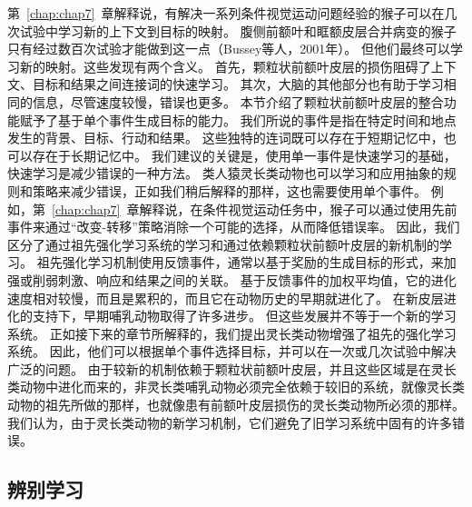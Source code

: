 第~\ref{chap:chap7}~章解释说，有解决一系列条件视觉运动问题经验的猴子可以在几次试验中学习新的上下文到目标的映射。
腹侧前额叶和眶额皮层合并病变的猴子只有经过数百次试验才能做到这一点（Bussey等人，2001年）。
但他们最终可以学习新的映射。这些发现有两个含义。
首先，颗粒状前额叶皮层的损伤阻碍了上下文、目标和结果之间连接词的快速学习。
其次，大脑的其他部分也有助于学习相同的信息，尽管速度较慢，错误也更多。
本节介绍了颗粒状前额叶皮层的整合功能赋予了基于单个事件生成目标的能力。
我们所说的事件是指在特定时间和地点发生的背景、目标、行动和结果。
这些独特的连词既可以存在于短期记忆中，也可以存在于长期记忆中。
我们建议的关键是，使用单一事件是快速学习的基础，快速学习是减少错误的一种方法。
类人猿灵长类动物也可以学习和应用抽象的规则和策略来减少错误，正如我们稍后解释的那样，这也需要使用单个事件。
例如，第~\ref{chap:chap7}~章解释说，在条件视觉运动任务中，猴子可以通过使用先前事件来通过“改变-转移”策略消除一个可能的选择，从而降低错误率。
因此，我们区分了通过祖先强化学习系统的学习和通过依赖颗粒状前额叶皮层的新机制的学习。
祖先强化学习机制使用反馈事件，通常以基于奖励的生成目标的形式，来加强或削弱刺激、响应和结果之间的关联。
基于反馈事件的加权平均值，它的进化速度相对较慢，而且是累积的，而且它在动物历史的早期就进化了。
在新皮层进化的支持下，早期哺乳动物取得了许多进步。
但这些发展并不等于一个新的学习系统。
正如接下来的章节所解释的，我们提出灵长类动物增强了祖先的强化学习系统。
因此，他们可以根据单个事件选择目标，并可以在一次或几次试验中解决广泛的问题。
由于较新的机制依赖于颗粒状前额叶皮层，并且这些区域是在灵长类动物中进化而来的，非灵长类哺乳动物必须完全依赖于较旧的系统，就像灵长类动物的祖先所做的那样，也就像患有前额叶皮层损伤的灵长类动物所必须的那样。
我们认为，由于灵长类动物的新学习机制，它们避免了旧学习系统中固有的许多错误。


\subsection{辨别学习}

